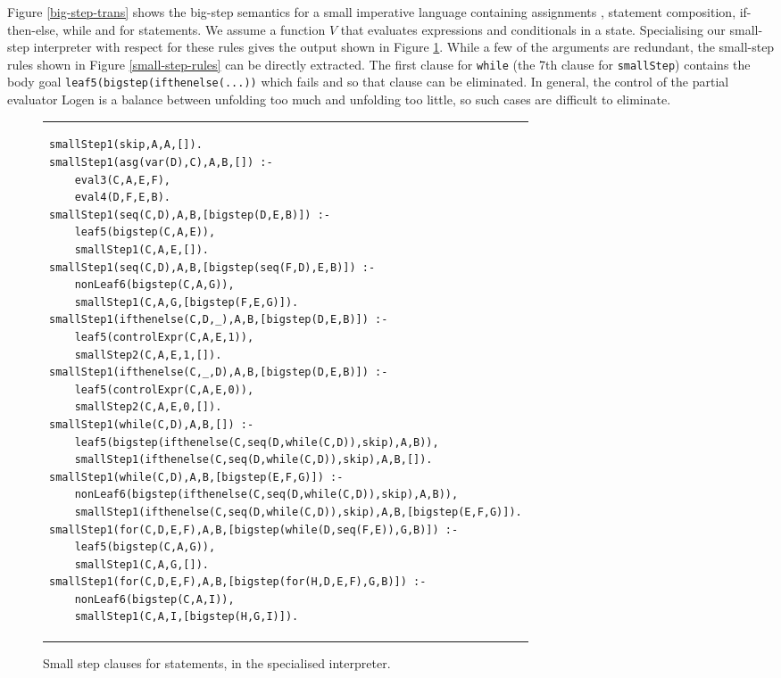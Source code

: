\documentclass{llncs}
\begin{document}
Figure \ref{big-step-trans} shows the big-step semantics for a small imperative language containing assignments , statement composition,
if-then-else, while and for statements.  We assume a function $V$ that evaluates expressions and conditionals in a state.  
Specialising our small-step interpreter with respect for these rules gives the output shown in Figure \ref{small-step-while}. While a few of the
arguments are redundant, the small-step rules shown in Figure \ref{small-step-rules} can be directly extracted.  The first clause for \texttt{while}
(the 7th clause for \texttt{smallStep}) contains the body goal \texttt{leaf5(bigstep(ifthenelse(...))} which fails and so that clause can be eliminated.
In general, the control of the partial evaluator {\sc  Logen}  is a balance between unfolding too much and unfolding too little, so such cases are 
difficult to eliminate.
\begin{figure}
\begin{tabular}{l}
\begin{lstlisting}
smallStep1(skip,A,A,[]).
smallStep1(asg(var(D),C),A,B,[]) :-
    eval3(C,A,E,F),
    eval4(D,F,E,B).
smallStep1(seq(C,D),A,B,[bigstep(D,E,B)]) :-
    leaf5(bigstep(C,A,E)),
    smallStep1(C,A,E,[]).
smallStep1(seq(C,D),A,B,[bigstep(seq(F,D),E,B)]) :-
    nonLeaf6(bigstep(C,A,G)),
    smallStep1(C,A,G,[bigstep(F,E,G)]).
smallStep1(ifthenelse(C,D,_),A,B,[bigstep(D,E,B)]) :-
    leaf5(controlExpr(C,A,E,1)),
    smallStep2(C,A,E,1,[]).
smallStep1(ifthenelse(C,_,D),A,B,[bigstep(D,E,B)]) :-
    leaf5(controlExpr(C,A,E,0)),
    smallStep2(C,A,E,0,[]).
smallStep1(while(C,D),A,B,[]) :-
    leaf5(bigstep(ifthenelse(C,seq(D,while(C,D)),skip),A,B)),
    smallStep1(ifthenelse(C,seq(D,while(C,D)),skip),A,B,[]).
smallStep1(while(C,D),A,B,[bigstep(E,F,G)]) :-
    nonLeaf6(bigstep(ifthenelse(C,seq(D,while(C,D)),skip),A,B)),
    smallStep1(ifthenelse(C,seq(D,while(C,D)),skip),A,B,[bigstep(E,F,G)]).
smallStep1(for(C,D,E,F),A,B,[bigstep(while(D,seq(F,E)),G,B)]) :-
    leaf5(bigstep(C,A,G)),
    smallStep1(C,A,G,[]).
smallStep1(for(C,D,E,F),A,B,[bigstep(for(H,D,E,F),G,B)]) :-
    nonLeaf6(bigstep(C,A,I)),
    smallStep1(C,A,I,[bigstep(H,G,I)]).

\end{lstlisting}
\end{tabular}
\caption{Small step clauses for statements, in the specialised interpreter.}\label{small-step-while}
\end{figure}
\end{document}
